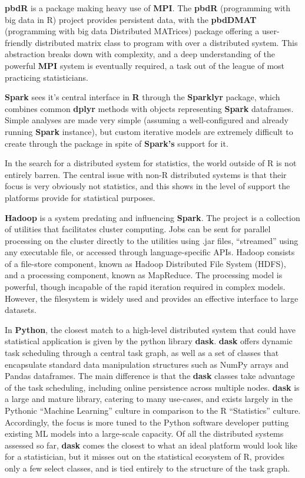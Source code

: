 \textbf{pbdR} is a package making heavy use of \textbf{MPI}\cite{pbdR2012}.
The \textbf{pbdR} (programming with big data in R) project provides persistent data, with the \textbf{pbdDMAT} (programming with big data Distributed MATrices) package offering a user-friendly distributed matrix class to program with over a distributed system\cite{pbdDMATpackage}.
This abstraction breaks down with complexity, and a deep understanding of the powerful \textbf{MPI} system is eventually required, a task out of the league of most practicing statisticians.

\textbf{Spark} sees it's central interface in \textbf{R} through the \textbf{Sparklyr} package, which combines common \textbf{dplyr} methods with objects representing \textbf{Spark} dataframes\cite{luraschi20}.
Simple analyses are made very simple (assuming a well-configured and already running \textbf{Spark} instance), but custom iterative models are extremely difficult to create through the package in spite of \textbf{Spark's} support for it.

In the search for a distributed system for statistics, the world outside of R is not entirely barren.
The central issue with non-R distributed systems is that their focus is very obviously not statistics, and this shows in the level of support the platforms provide for statistical purposes.

\textbf{Hadoop} is a system predating and influencing \textbf{Spark}\cite{shvachko2010hadoop}.
The project is a collection of utilities that facilitates cluster computing.
Jobs can be sent for parallel processing on the cluster directly to the utilities using .jar files, ``streamed'' using any executable file, or accessed through language-specific APIs.
Hadoop consists of a file-store component, known as Hadoop Distributed File System (HDFS), and a processing component, known as MapReduce.
The processing model is powerful, though incapable of the rapid iteration required in complex models.
However, the filesystem is widely used and provides an effective interface to large datasets.

In \textbf{Python}, the closest match to a high-level distributed system that could have statistical application is given by the python library \textbf{dask}\cite{rocklin2015dask}.
\textbf{dask} offers dynamic task scheduling through a central task graph, as well as a set of classes that encapsulate standard data manipulation structures such as NumPy arrays and Pandas dataframes.
The main difference is that the \textbf{dask} classes take advantage of the task scheduling, including online persistence across multiple nodes.
\textbf{dask} is a large and mature library, catering to many use-cases, and exists largely in the Pythonic ``Machine Learning'' culture in comparison to the R ``Statistics'' culture.
Accordingly, the focus is more tuned to the Python software developer putting existing ML models into a large-scale capacity.
Of all the distributed systems assessed so far, \textbf{dask} comes the closest to what an ideal platform would look like for a statistician, but it misses out on the statistical ecosystem of R, provides only a few select classes, and is tied entirely to the structure of the task graph.


